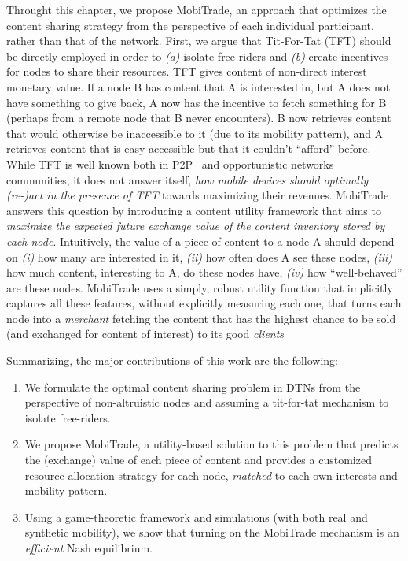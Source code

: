 Throught this chapter, we propose MobiTrade, an approach that optimizes the content sharing strategy from the perspective of each individual participant, rather than that of the network. First, we argue that Tit-For-Tat (TFT) should be directly employed in order to \emph{(a)} isolate free-riders and \emph{(b)} create incentives for nodes to share their resources. TFT gives content of non-direct interest monetary value. If a node B has content that A is interested in, but A does not have something to give back, A now has the incentive to fetch something for B (perhaps from a remote node that B never encounters). B now retrieves content that would otherwise be inaccessible to it (due to its mobility pattern), and A retrieves content that is easy accessible but that it couldn't ``afford'' before. While TFT is well known both in P2P~\cite{BitHoc} and opportunistic networks~\cite{BarterDTN} communities, it does not answer itself, \emph{how mobile devices should optimally (re-)act in the presence of TFT} towards maximizing their revenues. MobiTrade answers this question by introducing a content utility framework that aims to \emph{maximize the expected future exchange value of the content inventory stored by each node}. Intuitively, the value of a piece of content to a node A should depend on \emph{(i)} how many are interested in it, \emph{(ii)} how often does A see these nodes, \emph{(iii)} how much content, interesting to A, do these nodes have, \emph{(iv)} how ``well-behaved'' are these nodes. MobiTrade uses a simply, robust utility function that implicitly captures all these features, without explicitly measuring each one, that turns each node into a \emph{merchant} fetching the content that has the highest chance to be sold (and exchanged for content of interest) to its good \emph{clients}

Summarizing, the major contributions of this work are the following:
\begin{enumerate}
    \item We formulate the optimal content sharing problem in DTNs from the perspective of non-altruistic nodes and assuming a tit-for-tat mechanism to isolate free-riders.
    \item We propose MobiTrade, a utility-based solution to this problem that predicts the (exchange) value of each piece of content and provides a customized resource allocation strategy for each node, \emph{matched} to each own interests and mobility pattern.
    \item Using a game-theoretic framework and simulations (with both real and synthetic mobility), we show that turning on the MobiTrade mechanism is an \emph{efficient} Nash equilibrium.
\end{enumerate}

